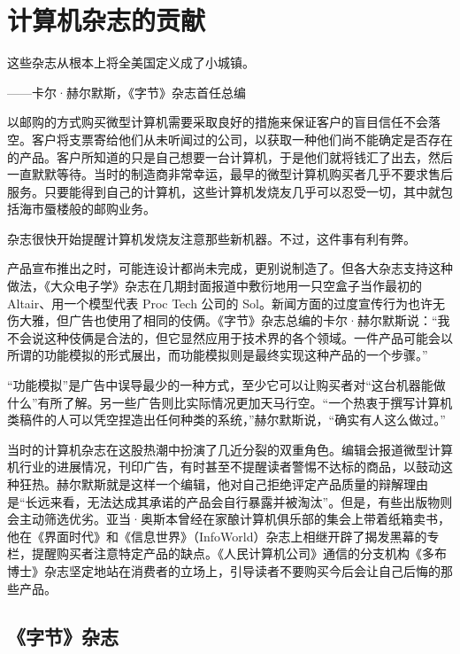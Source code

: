 \documentclass[12pt,UTF8]{ctexbook}
\begin{document}
\section{计算机杂志的贡献}


这些杂志从根本上将全美国定义成了小城镇。

——卡尔·赫尔默斯，《字节》杂志首任总编



以邮购的方式购买微型计算机需要采取良好的措施来保证客户的盲目信任不会落空。客户将支票寄给他们从未听闻过的公司，以获取一种他们尚不能确定是否存在的产品。客户所知道的只是自己想要一台计算机，于是他们就将钱汇了出去，然后一直默默等待。当时的制造商非常幸运，最早的微型计算机购买者几乎不要求售后服务。只要能得到自己的计算机，这些计算机发烧友几乎可以忍受一切，其中就包括海市蜃楼般的邮购业务。

杂志很快开始提醒计算机发烧友注意那些新机器。不过，这件事有利有弊。

产品宣布推出之时，可能连设计都尚未完成，更别说制造了。但各大杂志支持这种做法，《大众电子学》杂志在几期封面报道中敷衍地用一只空盒子当作最初的 Altair、用一个模型代表 Proc Tech 公司的 Sol。新闻方面的过度宣传行为也许无伤大雅，但广告也使用了相同的伎俩。《字节》杂志总编的卡尔·赫尔默斯说：“我不会说这种伎俩是合法的，但它显然应用于技术界的各个领域。一件产品可能会以所谓的功能模拟的形式展出，而功能模拟则是最终实现这种产品的一个步骤。”

“功能模拟”是广告中误导最少的一种方式，至少它可以让购买者对“这台机器能做什么”有所了解。另一些广告则比实际情况更加天马行空。“一个热衷于撰写计算机类稿件的人可以凭空捏造出任何种类的系统，”赫尔默斯说，“确实有人这么做过。”

当时的计算机杂志在这股热潮中扮演了几近分裂的双重角色。编辑会报道微型计算机行业的进展情况，刊印广告，有时甚至不提醒读者警惕不达标的商品，以鼓动这种狂热。赫尔默斯就是这样一个编辑，他对自己拒绝评定产品质量的辩解理由是“长远来看，无法达成其承诺的产品会自行暴露并被淘汰”。但是，有些出版物则会主动筛选优劣。亚当·奥斯本曾经在家酿计算机俱乐部的集会上带着纸箱卖书，他在《界面时代》和《信息世界》（InfoWorld）杂志上相继开辟了揭发黑幕的专栏，提醒购买者注意特定产品的缺点。《人民计算机公司》通信的分支机构《多布博士》杂志坚定地站在消费者的立场上，引导读者不要购买今后会让自己后悔的那些产品。





\subsection{《字节》杂志}
\end{document}

